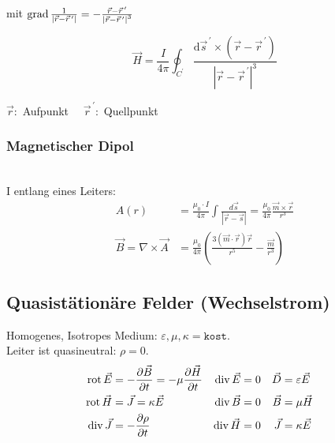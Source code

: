 mit $\operatorname{grad} \frac{1}{\left|\vec{r}-\vec{r}^{\,\prime}\right|}=-\frac{\vec{r}-\vec{r}^{\,\prime}}{\left|\vec{r}-\vec{r}^{\,\prime}\right|^{3}}$

\[
    \vec{H}=\frac{I}{4 \pi} \oint_{C^{\prime}} \frac{\mathrm{d} \vec{s}^{\,\prime} \times\left(\vec{r}-\vec{r}^{\,\prime}\right)}{\left|\vec{r}-\vec{r}^{\,\prime}\right|^{3}}
\]

{\footnotesize$\vec{r}:$ Aufpunkt $\quad \vec{r}^{\,\prime}:$ Quellpunkt}

\subsubsection{Magnetischer Dipol}
\\
I entlang eines Leiters:
\begin{align*} 
    A(r)                            & = \frac{\mu_0 \cdot I}{4 \pi} \int \frac{d \vec{s}}{| \vec{r} - \vec{s}|} = \frac{ \mu_0}{4 \pi} \frac{\vec{m} \times \vec{r}}{r^3} \\
    \vec{B} = \nabla \times \vec{A} & = \frac{\mu_0}{4 \pi} \left(\frac{3(\vec{m} \cdot \vec{r})\vec{r}}{r^5} - \frac{\vec{m}}{r^3}\right)
\end{align*}

\subsection{Quasistätionäre Felder (Wechselstrom)}
Homogenes, Isotropes Medium: $ \varepsilon, \mu, \kappa = \mathtt{kost.} $\\
Leiter ist quasineutral: $ \rho = 0 $.
\begin{align*}
	\operatorname{rot} \vec{E} & = -\frac{\partial \vec{B}}{\partial t} = -\mu \frac{\partial \vec{H}}{\partial t} & \operatorname{div} \vec{E} & = 0 & \vec{D}  &= \varepsilon\vec{E} & \\
	\operatorname{rot} \vec{H} & = \vec{J} = \kappa \vec{E} & \operatorname{div} \vec{B} & = 0 &\vec{B}  &= \mu\vec{H}&\\
	\operatorname{div} \vec{J} &= -\frac{\partial \rho}{\partial t}& \operatorname{div} \vec{H} &= 0 & \vec{J} &= \kappa \vec{E}&
\end{align*}

